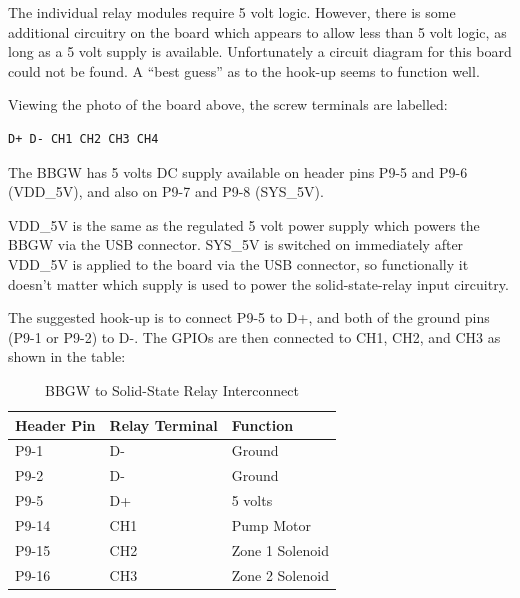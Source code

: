 The individual relay modules require 5 volt logic.  However, there is some 
additional circuitry on the board which appears to allow less than 5 volt 
logic, as long as a 5 volt supply is available.  Unfortunately a circuit 
diagram for this board could not be found.  A ``best guess'' as to the hook-up 
seems to function well.

Viewing the photo of the board above, the screw terminals are labelled:

\begin{verbatim}
D+ D- CH1 CH2 CH3 CH4
\end{verbatim}

The BBGW has 5 volts DC supply available on header pins P9-5 and P9-6 
(VDD\_5V), and also on P9-7 and P9-8 (SYS\_5V).

VDD\_5V is the same as the regulated 5 volt power supply which powers the BBGW 
via the USB connector.  SYS\_5V is switched on immediately after VDD\_5V is 
applied to the board via the USB connector, so functionally it doesn't matter 
which supply is used to power the solid-state-relay input circuitry.

The suggested hook-up is to connect P9-5 to D+, and both of the ground pins 
(P9-1 or P9-2) to D-.  The GPIOs are then connected to CH1, CH2, and CH3 as 
shown in the table:

\begin{longtable}{lll}
\caption{BBGW to Solid-State Relay Interconnect}\\
\toprule
Header Pin & Relay Terminal & Function \\\midrule
P9-1 & D- & Ground \\
P9-2 & D- & Ground \\
P9-5 & D+ & 5 volts \\
P9-14 & CH1 & Pump Motor \\
P9-15 & CH2 & Zone 1 Solenoid \\
P9-16 & CH3 & Zone 2 Solenoid
\end{longtable}
